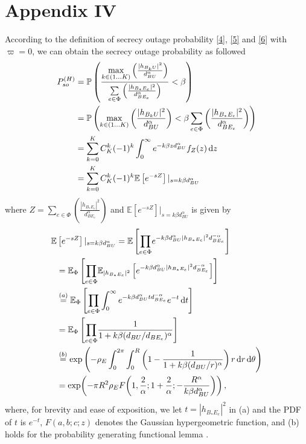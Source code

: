 \documentclass[10pt]{IEEEtran}
\newcommand{\rmd}{\,{\rm d}}
\begin{document}
\section*{Appendix IV}
According to the definition of secrecy outage probability \eqref{4}, \eqref{5} and \eqref{6} with $\varpi = 0$, we can obtain the secrecy outage probability as followed
\begin{equation}\label{23}
\begin{split}
P^{(H)}_{so} &= \mathbb{P}\left(\frac{\underset{k\in (1...K)}{\max}\left(\frac{|h_{B_kU}|^2}{d_{BU}^\alpha}\right)}{\underset{e\in \Phi}\sum\left(\frac{|h_{B_*E_e}|^2}{d_{BE_e}^\alpha}\right)}<\beta\right)\\
& = \mathbb{P}\left(\underset{k\in (1...K)}{\max}\left(\frac{|h_{B_kU}|^2}{d_{BU}^\alpha}\right)<\beta\sum_{e\in\Phi}\left(\frac{|h_{B_*E_e}|^2}{d_{BE_e}^\alpha}\right)\right)\\
& = \sum^K_{k=0}C^k_K(-1)^k\int_0^\infty e^{-k\beta zd^\alpha_{BU}}f_Z(z)\rmd z\\
& = \sum^K_{k=0}C^k_K(-1)^k\mathbb{E}\left[e^{-sZ}\right]|_{s=k\beta d^\alpha_{BU}}
\end{split}
\end{equation}
where $Z =\underset{e\in \Phi}\sum\left(\frac{|h_{B_*E_e}|^2}{d_{BE_e}^\alpha}\right)$ and $\mathbb{E}\left[e^{-sZ}\right]|_{s=k\beta d^\alpha_{BU}}$ is given by
\begin{equation}\label{24}
\begin{split}
\mathbb{E}&\left[e^{-sZ}\right]|_{s=k\beta d^\alpha_{BU}}=\mathbb{E}\left[\underset{e\in \Phi}\prod e^{-k\beta d^\alpha_{BU}|h_{B_*E_e}|^2d_{BE_e}^{-\alpha}}\right]\\
& = \mathbb{E}_\Phi\left[\underset{e\in \Phi}\prod \mathbb{E}_{|h_{B_*E_e}|^2}\left[e^{-k\beta d^\alpha_{BU}|h_{B_*E_e}|^2d_{BE_e}^{-\alpha}}\right]\right]\\
& \overset{(a)}{=} \mathbb{E}_\Phi\left[\underset{e\in \Phi}\prod \int_0^\infty e^{-k\beta d^\alpha_{BU}td_{BE_e}^{-\alpha}}e^{-t}\rmd t\right]\\
& = \mathbb{E}_\Phi\left[\underset{e\in \Phi}\prod \frac{1}{1+k\beta(d_{BU}/d_{BE_e})^\alpha}\right]\\
& \overset{(b)}{=} \textrm{exp}\left(-\rho_E\int_0^{2\pi}\int_0^{R}\left(1-\frac{1}{1+k\beta(d_{BU}/r)^\alpha}\right)r\rmd r\rmd \theta\right)\\
& = \exp\!\left(-\pi R^2\rho_E F\!\left(1,\frac{2}{\alpha};1+\frac{2}{\alpha};-\frac{R^\alpha}{k\beta d_{BU}^\alpha}\right)\right),
\end{split}
\end{equation}
where, for brevity and ease of exposition, we let $t = |h_{B_*E_e}|^2$ in (a) and the PDF of $t$ is $e^{-t}$, $F(a,b;c;z)$ denotes the Gaussian hypergeometric function, and (b) holds for the probability generating functional lemma \cite{M.H12}.
\end{document}
